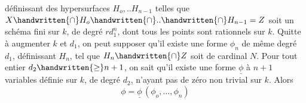 définissant des hypersurfaces $H_o,..H_{n-1}$ telles que $X\handwritten{\cap}H_o\handwritten{\cap}..\handwritten{\cap}H_{n-1}=Z$ soit un schéma fini  sur $k$, de degré $rd_1^n$, dont tous les points sont rationnels sur $k$. Quitte à augmenter $k$ et $d_1$, on peut supposer qu'il existe une forme $\phi_n$ de même degré $d_1$, définissant $H_n$, tel que $H_n\handwritten{\cap}Z$ soit de cardinal $N$. Pour tout entier $d_2\handwritten{\geq}n+1$, on sait qu'il existe une forme $\underline{\phi}$ à $n+1$ variables  définie sur $k$, de degré $d_2$,  n'ayant pas de zéro non trivial sur $k$. Alors
\[
\phi=\underline{\phi}\,(\phi_o,\ldots,\phi_n)
\]
